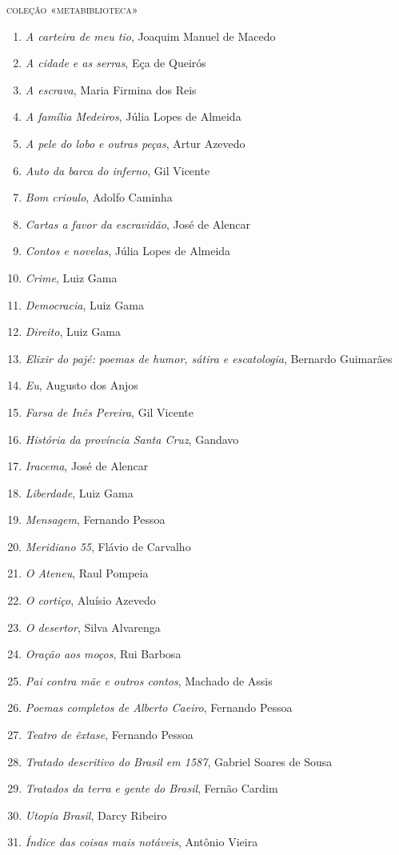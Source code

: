 {\large\textsc{coleção «metabiblioteca»}}

\begin{enumerate}
\setlength\parskip{4.2pt}
\setlength\itemsep{-1.4mm}
\item \textit{A carteira de meu tio}, Joaquim Manuel de Macedo
\item \textit{A cidade e as serras}, Eça de Queirós
\item \textit{A escrava}, Maria Firmina dos Reis
\item \textit{A família Medeiros}, Júlia Lopes de Almeida 
\item \textit{A pele do lobo e outras peças}, Artur Azevedo
\item \textit{Auto da barca do inferno}, Gil Vicente
\item \textit{Bom crioulo}, Adolfo Caminha
\item \textit{Cartas a favor da escravidão}, José de Alencar
\item \textit{Contos e novelas}, Júlia Lopes de Almeida
\item \textit{Crime}, Luiz Gama
\item \textit{Democracia}, Luiz Gama
\item \textit{Direito}, Luiz Gama
\item \textit{Elixir do pajé: poemas de humor, sátira e escatologia}, Bernardo Guimarães
\item \textit{Eu}, Augusto dos Anjos
\item \textit{Farsa de Inês Pereira}, Gil Vicente
\item \textit{História da província Santa Cruz}, Gandavo
\item \textit{Iracema}, José de Alencar
\item \textit{Liberdade}, Luiz Gama
\item \textit{Mensagem}, Fernando Pessoa
\item \textit{Meridiano 55}, Flávio de Carvalho
\item \textit{O Ateneu}, Raul Pompeia
\item \textit{O cortiço}, Aluísio Azevedo
\item \textit{O desertor}, Silva Alvarenga
\item \textit{Oração aos moços}, Rui Barbosa
\item \textit{Pai contra mãe e outros contos}, Machado de Assis
\item \textit{Poemas completos de Alberto Caeiro}, Fernando Pessoa
\item \textit{Teatro de êxtase}, Fernando Pessoa
\item \textit{Tratado descritivo do Brasil em 1587}, Gabriel Soares de Sousa
\item \textit{Tratados da terra e gente do Brasil}, Fernão Cardim 
\item \textit{Utopia Brasil}, Darcy Ribeiro
\item \textit{Índice das coisas mais notáveis}, Antônio Vieira
\end{enumerate}

